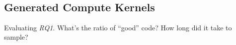 \documentclass[preprint,nonatbib,10pt,nocopyrightspace]{sigplanconf}
\begin{document}
\begin{table}%
  \centering
  \\
  \caption{%
    Cross-benchmark autotuning results.}
\label{tab:bench-xval-bench}
\end{table}

\subsection{Generated Compute Kernels}\label{subsec:}

Evaluating \emph{RQ1}. What's the ratio of ``good'' code? How long did
it take to sample?
\end{document}
